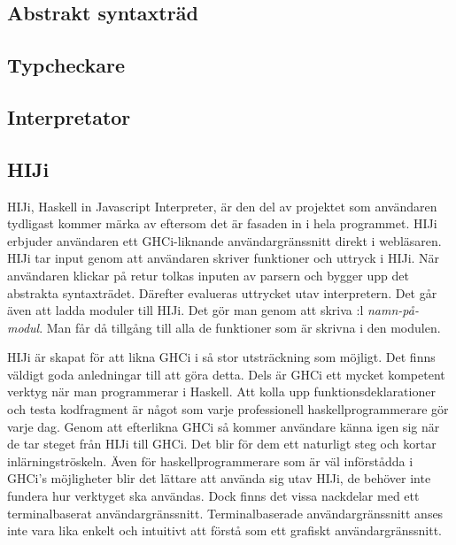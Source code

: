 \subsection{Abstrakt syntaxträd} 

\subsection{Typcheckare} 

\subsection{Interpretator}


\subsection{HIJi}
HIJi, Haskell in Javascript Interpreter, är den del av projektet som användaren tydligast kommer märka av eftersom det är fasaden in i hela programmet.
HIJi erbjuder användaren ett GHCi-liknande användargränssnitt direkt i webläsaren. 
HIJi tar input genom att användaren skriver funktioner och uttryck i HIJi. När användaren klickar på retur tolkas inputen av parsern och bygger upp det abstrakta syntaxträdet. Därefter evalueras uttrycket utav interpretern.
Det går även att ladda moduler till HIJi. Det gör man genom att skriva :l \emph{namn-på-modul}. Man får då tillgång till alla de funktioner som är skrivna i den modulen. 

HIJi är skapat för att likna GHCi i så stor utsträckning som möjligt. Det finns väldigt goda anledningar till att göra detta. Dels är GHCi ett mycket kompetent verktyg när man programmerar i Haskell. Att kolla upp funktionsdeklarationer och testa kodfragment är något som varje professionell haskellprogrammerare gör varje dag. Genom att efterlikna GHCi så kommer användare känna igen sig när de tar steget från HIJi till GHCi. Det blir för dem ett naturligt steg och kortar inlärningströskeln. Även för haskellprogrammerare som är väl införstådda i GHCi's möjligheter blir det lättare att använda sig utav HIJi, de behöver inte fundera hur verktyget ska användas.
Dock finns det vissa nackdelar med ett terminalbaserat användargränssnitt. Terminalbaserade användargränssnitt anses inte vara lika enkelt och intuitivt att förstå som ett grafiskt användargränssnitt. 



